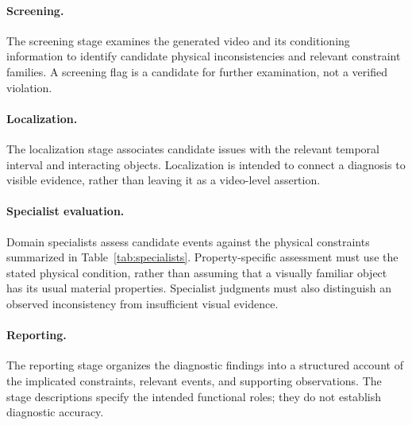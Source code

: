 \documentclass{article} %
\begin{document}
\paragraph{Screening.}
The screening stage examines the generated video and its
conditioning information to identify candidate physical
inconsistencies and relevant constraint families.
A screening flag is a candidate for further examination,
not a verified violation.

\paragraph{Localization.}
The localization stage associates candidate issues with
the relevant temporal interval and interacting objects.
Localization is intended to connect a diagnosis to
visible evidence, rather than leaving it as a
video-level assertion.

\paragraph{Specialist evaluation.}
Domain specialists assess candidate events against the
physical constraints summarized in
Table~\ref{tab:specialists}. Property-specific assessment
must use the stated physical condition, rather than
assuming that a visually familiar object has its
usual material properties. Specialist judgments must
also distinguish an observed inconsistency from
insufficient visual evidence.

\paragraph{Reporting.}
The reporting stage organizes the diagnostic findings
into a structured account of the implicated constraints,
relevant events, and supporting observations.
The stage descriptions specify the intended functional
roles; they do not establish diagnostic accuracy.

\end{document}
